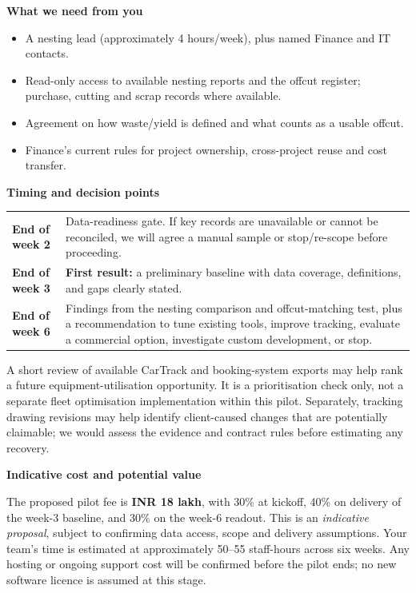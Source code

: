 \documentclass[10pt,a4paper]{article}
\newcommand{\sectionlabel}[1]{\vspace{2pt}\textbf{#1}\par}
\begin{document}
\sectionlabel{What we need from you}
\begin{itemize}
\item A nesting lead (approximately 4 hours/week), plus named Finance and IT contacts.
\item Read-only access to available nesting reports and the offcut register; purchase, cutting and scrap records where available.
\item Agreement on how waste/yield is defined and what counts as a usable offcut.
\item Finance's current rules for project ownership, cross-project reuse and cost transfer.
\end{itemize}

\sectionlabel{Timing and decision points}
\begin{tabular}{@{}p{2.7cm}p{\dimexpr\textwidth-2.7cm-2\tabcolsep\relax}@{}}
\toprule
\textbf{End of week 2} & Data-readiness gate. If key records are unavailable or cannot be reconciled, we will agree a manual sample or stop/re-scope before proceeding.\\
\textbf{End of week 3} & \textbf{First result:} a preliminary baseline with data coverage, definitions, and gaps clearly stated.\\
\textbf{End of week 6} & Findings from the nesting comparison and offcut-matching test, plus a recommendation to tune existing tools, improve tracking, evaluate a commercial option, investigate custom development, or stop.\\
\bottomrule
\end{tabular}

A short review of available CarTrack and booking-system exports may help rank a future equipment-utilisation opportunity. It is a prioritisation check only, not a separate fleet optimisation implementation within this pilot. Separately, tracking drawing revisions may help identify client-caused changes that are potentially claimable; we would assess the evidence and contract rules before estimating any recovery.

\sectionlabel{Indicative cost and potential value}
The proposed pilot fee is \textbf{INR 18 lakh}, with 30\% at kickoff, 40\% on delivery of the week-3 baseline, and 30\% on the week-6 readout. This is an \emph{indicative proposal}, subject to confirming data access, scope and delivery assumptions. Your team's time is estimated at approximately 50--55 staff-hours across six weeks. Any hosting or ongoing support cost will be confirmed before the pilot ends; no new software licence is assumed at this stage.
\end{document}
